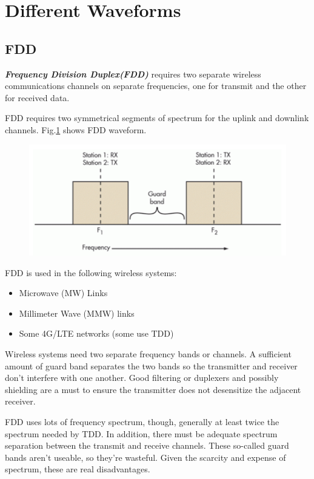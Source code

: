 \documentclass[conference]{IEEEtran}
\begin{document}
\section{Different Waveforms} \label{sec:dw}
\subsection{FDD}
{\bfseries{\emph{Frequency Division Duplex(FDD)}}} requires two separate wireless communications channels on separate frequencies, one for transmit and the other for received data\cite{6983336}. 

FDD requires two symmetrical segments of spectrum for the uplink and downlink channels. Fig.\ref{fig:FDD} shows FDD waveform.

\begin{figure}[!ht]
	\centering
	\begin{center}
		\includegraphics*[width=0.8\linewidth]{FDD}
		\caption{}
		\label{fig:FDD}
	\end{center}
\end{figure}

FDD is used in the following wireless systems:
\begin{itemize}
	\item Microwave (MW) Links
	\item Millimeter Wave (MMW) links
	\item Some 4G/LTE networks (some use TDD)
\end{itemize}

Wireless systems need two separate frequency bands or channels. A sufficient amount of guard band separates the two bands so the transmitter and receiver don't interfere with one another. Good filtering or duplexers and possibly shielding are a must to ensure the transmitter does not desensitize the adjacent receiver.

FDD uses lots of frequency spectrum, though, generally at least twice the spectrum needed by TDD. In addition, there must be adequate spectrum separation between the transmit and receive channels\cite{wireless.org}. These so-called guard bands aren't useable, so they're wasteful. Given the scarcity and expense of spectrum, these are real disadvantages.
\end{document}
